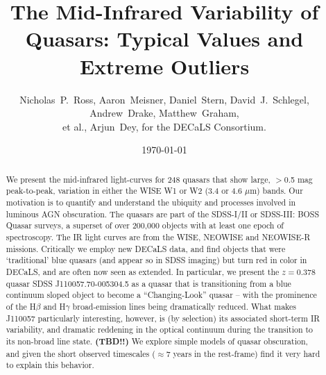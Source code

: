 \documentclass[apj]{emulateapj}
\begin{document}

\title{The Mid-Infrared Variability of Quasars: 
         Typical Values and Extreme Outliers
}
\author{
Nicholas~P.~Ross, 
Aaron~Meisner, 
Daniel~Stern,
David~J.~Schlegel,
Andrew~Drake, 
Matthew~Graham, \\
et al.,  
 Arjun~Dey,
for the DECaLS Consortium. 
}


\date{\today}

\begin{abstract}
We present the mid-infrared light-curves for 248 quasars that show
large, $>$0.5 mag peak-to-peak, variation in either the WISE W1 or W2
(3.4 or 4.6 $\mu$m) bands. Our motivation is to quantify and
understand the ubiquity and processes involved in luminous AGN
obscuration.  The quasars are part of the SDSS-I/II or SDSS-III: BOSS
Quasar surveys, a superset of over 200,000 objects with at least one
epoch of spectroscopy. The IR light curves are from the WISE, NEOWISE
and NEOWISE-R missions.
Critically we employ new DECaLS data, and find objects that were
`traditional' blue quasars (and appear so in SDSS imaging) but turn
red in color in DECaLS, and are often now seen as extended.
In particular, we present the $z=0.378$ quasar SDSS
J110057.70-005304.5 as a quasar that is transitioning from a blue
continuum sloped object to become a ``Changing-Look'' quasar -- with the
prominence of the H$\beta$ and H$\gamma$ broad-emission lines being
dramatically reduced. What makes J110057 particularly interesting,
however, is (by selection) its associated short-term IR variability,
and dramatic reddening in the optical continuum during the transition
to its non-broad line state.
{\bf (TBD!!)} We explore simple models of quasar obscuration, and
given the short observed timescales ($\approx$7 years in the rest-frame) 
find it very hard to explain this behavior.
\end{abstract}
\end{document}
